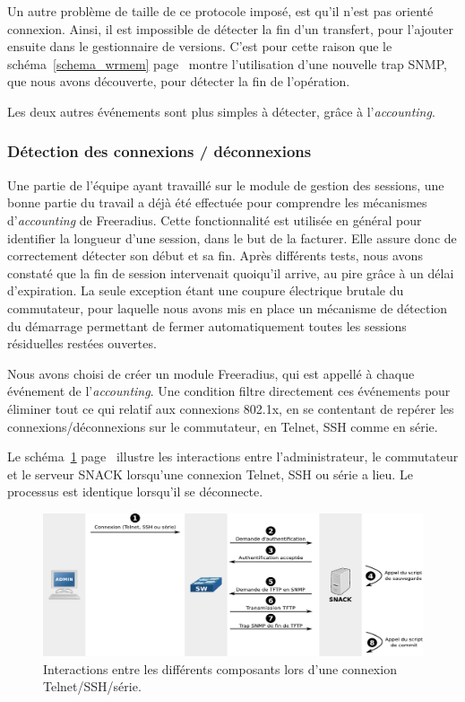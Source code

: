 Un autre problème de taille de ce protocole imposé, est qu'il n'est pas orienté connexion. Ainsi, il est impossible de détecter la fin d'un transfert, pour l'ajouter ensuite dans le gestionnaire de versions. C'est pour cette raison que le schéma~\ref{schema_wrmem} page~\pageref{schema_wrmem} montre l'utilisation d'une nouvelle trap SNMP, que nous avons découverte, pour détecter la fin de l'opération.

Les deux autres événements sont plus simples à détecter, grâce à l'\emph{accounting}.

\subsubsection{Détection des connexions / déconnexions}

Une partie de l'équipe ayant travaillé sur le module de gestion des sessions, une bonne partie du travail a déjà été effectuée pour comprendre les mécanismes d'\emph{accounting} de Freeradius. Cette fonctionnalité est utilisée en général pour identifier la longueur d'une session, dans le but de la facturer. Elle assure donc de correctement détecter son début et sa fin. Après différents tests, nous avons constaté que la fin de session intervenait quoiqu'il arrive, au pire grâce à un délai d'expiration. La seule exception étant une coupure électrique brutale du commutateur, pour laquelle nous avons mis en place un mécanisme de détection du démarrage permettant de fermer automatiquement toutes les sessions résiduelles restées ouvertes.

Nous avons choisi de créer un module Freeradius, qui est appellé à chaque événement de l'\emph{accounting}. Une condition filtre directement ces événements pour éliminer tout ce qui relatif aux connexions 802.1x, en se contentant de repérer les connexions/déconnexions sur le commutateur, en Telnet, SSH comme en série.

Le schéma~\ref{schema_auth} page~\pageref{schema_auth} illustre les interactions entre l'administrateur, le commutateur et le serveur SNACK lorsqu'une connexion Telnet, SSH ou série a lieu. Le processus est identique lorsqu'il se déconnecte.

\begin{figure}[!h]
	\begin{center}
	    \includegraphics[width=\textwidth]{img/auth.pdf}
	\end{center}
	\caption{Interactions entre les différents composants lors d'une connexion Telnet/SSH/série.}
	\label{schema_auth}
\end{figure}

